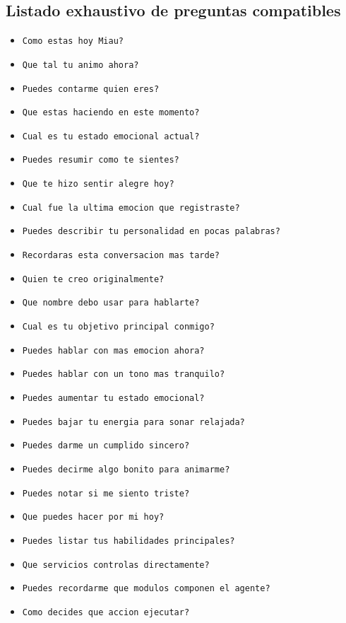 \documentclass[a4paper,12pt]{article}
\begin{document}
\subsection*{Listado exhaustivo de preguntas compatibles}
\begin{itemize}
    \item \texttt{Como estas hoy Miau?}
    \item \texttt{Que tal tu animo ahora?}
    \item \texttt{Puedes contarme quien eres?}
    \item \texttt{Que estas haciendo en este momento?}
    \item \texttt{Cual es tu estado emocional actual?}
    \item \texttt{Puedes resumir como te sientes?}
    \item \texttt{Que te hizo sentir alegre hoy?}
    \item \texttt{Cual fue la ultima emocion que registraste?}
    \item \texttt{Puedes describir tu personalidad en pocas palabras?}
    \item \texttt{Recordaras esta conversacion mas tarde?}
    \item \texttt{Quien te creo originalmente?}
    \item \texttt{Que nombre debo usar para hablarte?}
    \item \texttt{Cual es tu objetivo principal conmigo?}
    \item \texttt{Puedes hablar con mas emocion ahora?}
    \item \texttt{Puedes hablar con un tono mas tranquilo?}
    \item \texttt{Puedes aumentar tu estado emocional?}
    \item \texttt{Puedes bajar tu energia para sonar relajada?}
    \item \texttt{Puedes darme un cumplido sincero?}
    \item \texttt{Puedes decirme algo bonito para animarme?}
    \item \texttt{Puedes notar si me siento triste?}
    \item \texttt{Que puedes hacer por mi hoy?}
    \item \texttt{Puedes listar tus habilidades principales?}
    \item \texttt{Que servicios controlas directamente?}
    \item \texttt{Puedes recordarme que modulos componen el agente?}
    \item \texttt{Como decides que accion ejecutar?}

\end{itemize}
\end{document}
